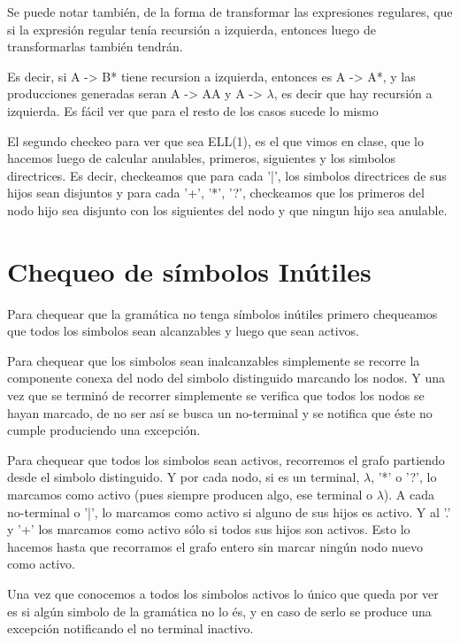 \documentclass[a4paper]{report}
\begin{document}
Se puede notar también, de la forma de transformar las expresiones regulares,
que si la expresión regular tenía recursión a izquierda, entonces luego de
transformarlas también tendrán.


Es decir, si A -> B* tiene recursion a izquierda, entonces es A -> A*, y las
producciones generadas seran A -> AA y A -> $\lambda$, es decir que hay recursión a
izquierda. Es fácil ver que para el resto de los casos sucede lo mismo


El segundo checkeo para ver que sea ELL(1), es el que vimos en clase, que lo
hacemos luego de calcular anulables, primeros, siguientes y los simbolos
directrices. Es decir, checkeamos que para cada '|', los simbolos directrices de
sus hijos sean disjuntos y para cada '+', '*', '?', checkeamos que los primeros
del nodo hijo sea disjunto con los siguientes del nodo y que ningun hijo sea
anulable.


\section*{Chequeo de símbolos Inútiles}

	Para chequear que la gramática no tenga símbolos inútiles primero chequeamos que todos 
los simbolos sean alcanzables y luego que sean activos.


	Para chequear que los simbolos sean inalcanzables simplemente se recorre la componente 
conexa del nodo del simbolo distinguido marcando los nodos. Y una vez que se terminó de recorrer 
simplemente se verifica que todos los nodos se hayan marcado, de no ser así se busca un no-terminal
y se notifica que éste no cumple produciendo una excepción.


	Para chequear que todos los simbolos sean activos, recorremos el grafo partiendo desde el
simbolo distinguido. Y por cada nodo, si es un terminal, $\lambda$, '*' o '?', lo
marcamos como activo (pues siempre producen algo, ese terminal o $\lambda$). A cada
no-terminal o '|', lo marcamos como activo si alguno de sus hijos es activo. Y al
'.' y '+' los marcamos como activo sólo si todos sus hijos son activos. Esto lo
hacemos hasta que recorramos el grafo entero sin marcar ningún nodo nuevo como activo.


	Una vez que conocemos a todos los simbolos activos lo único que queda por ver es si algún 
simbolo de la gramática no lo és, y en caso de serlo se produce una excepción notificando el no terminal inactivo.
\end{document}
